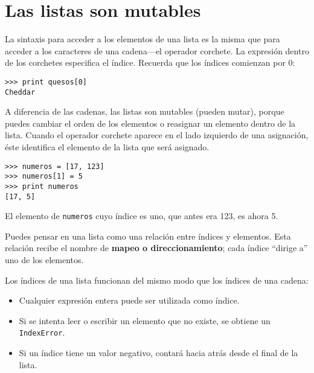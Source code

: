 
\section{Las listas son mutables}


La sintaxis para acceder a los elementos de una lista es la misma que
para acceder a los caracteres de una cadena---el operador corchete. La
expresión dentro de los corchetes especifica el índice. Recuerda que los
índices comienzan por 0:

\beforeverb
\begin{verbatim}
>>> print quesos[0]
Cheddar
\end{verbatim}
\afterverb
%
A diferencia de las cadenas, las listas son mutables (pueden mutar), porque puedes cambiar el orden
de los elementos o reasignar un elemento dentro de la lista.
Cuando el operador corchete aparece en el lado izquierdo de una asignación,
éste identifica el elemento de la lista que será asignado.


\beforeverb
\begin{verbatim}
>>> numeros = [17, 123]
>>> numeros[1] = 5
>>> print numeros
[17, 5]
\end{verbatim}
\afterverb
%
El elemento de {\tt numeros} cuyo índice es uno, que
antes era 123, es ahora 5.


Puedes pensar en una lista como una relación entre índices y
elementos. Esta relación recibe el nombre de {\bf mapeo o direccionamiento}; cada índice
``dirige a'' uno de los elementos.



Los índices de una lista funcionan del mismo modo que los índices de una cadena:

\begin{itemize}

\item Cualquier expresión entera puede ser utilizada como índice.

\item Si se intenta leer o escribir un elemento que no existe,
se obtiene un {\tt IndexError}.


\item Si un índice tiene un valor negativo, contará hacia atrás desde
el final de la lista.

\end{itemize}


